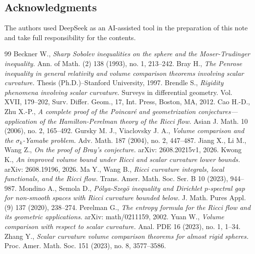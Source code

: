 \documentclass[12pt]{amsart}
\theoremstyle{definition}
\theoremstyle{remark}
\numberwithin{equation}{section}
\begin{document}
\subsection*{Acknowledgments}
The authors used DeepSeek as an AI-assisted tool in the preparation 
of this note and take full responsibility for the contents.
\begin{thebibliography}{99}
Beckner W., {\sl Sharp Sobolev inequalities on the sphere and the Moser-Trudinger inequality.} Ann. of Math. (2) 138 (1993), no. 1, 213--242.
Bray H., {\sl The Penrose inequality in general relativity and volume comparison theorems involving scalar curvature.} Thesis (Ph.D.)–Stanford University, 1997. 
Brendle S., {\sl Rigidity phenomena involving scalar curvature.} Surveys in differential geometry. Vol. XVII, 179--202, Surv. Differ. Geom., 17, Int. Press, Boston, MA, 2012.
Cao H.-D., Zhu X.-P., {\sl A complete proof of the Poincaré and geometrization conjectures—application of the Hamilton-Perelman theory of the Ricci flow.} Asian J. Math. 10 (2006), no. 2, 165--492.
Gursky M. J.,  Viaclovsky J. A., {\sl Volume comparison and the $\sigma_k$-Yamabe problem.} Adv. Math. 187 (2004), no. 2, 447--487.
Jiang X., Li M., Wang Z., {\sl On the proof of Bray's conjecture.} arXiv: 2608.20215v1, 2026.
Kwong K., {\sl An improved volume bound under Ricci and scalar curvature lower bounds.} arXiv: 2608.19196, 2026.
 Ma Y., Wang B., {\sl Ricci curvature integrals, local functionals, and the Ricci flow.} Trans. Amer. Math. Soc. Ser. B 10 (2023), 944--987. 
Mondino A., Semola D., {\sl P\'olya-Szeg\"o inequality and Dirichlet $p$-spectral gap for non-smooth spaces with Ricci curvature bounded below.} J. Math. Pures Appl. (9) 137 (2020), 238--274. 
Perelman G., {\sl The entropy formula for the Ricci flow and its geometric applications.} arXiv: math/0211159, 2002.
Yuan W., {\sl Volume comparison with respect to scalar curvature.} Anal. PDE 16 (2023), no. 1, 1--34.
 Zhang Y., {\sl Scalar curvature volume comparison theorems for almost rigid spheres.} Proc. Amer. Math. Soc. 151 (2023), no. 8, 3577--3586.
\end{thebibliography}
\end{document}
